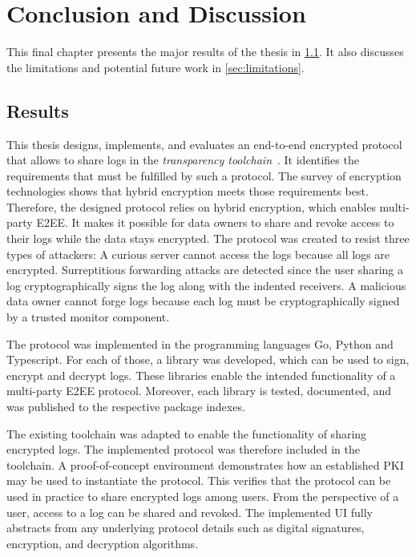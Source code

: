 \documentclass[../main.tex]{subfiles}
\begin{document}
\chapter{Conclusion and Discussion}
\label{chap:conclusion}

This final chapter presents the major results of the thesis in \cref{sec:result}.
It also discusses the limitations and potential future work in \cref{sec:limitations}.

\section{Results}
\label{sec:result}

This thesis designs, implements, and evaluates an end-to-end encrypted protocol that allows to share logs in the \emph{transparency toolchain}~\cite{Zieglmeier2021}.
It identifies the requirements that must be fulfilled by such a protocol.
The survey of encryption technologies shows that hybrid encryption meets those requirements best.
Therefore, the designed protocol relies on hybrid encryption, which enables multi-party E2EE.
It makes it possible for data owners to share and revoke access to their logs while the data stays encrypted.
The protocol was created to resist three types of attackers: 
A curious server cannot access the logs because all logs are encrypted.
Surreptitious forwarding attacks are detected since the user sharing a log cryptographically signs the log along with the indented receivers.
A malicious data owner cannot forge logs because each log must be cryptographically signed by a trusted monitor component.

The protocol was implemented in the programming languages Go, Python and Typescript.
For each of those, a library was developed, which can be used to sign, encrypt and decrypt logs.
These libraries enable the intended functionality of a multi-party E2EE protocol.
Moreover, each library is tested, documented, and was published to the respective package indexes.

The existing toolchain was adapted to enable the functionality of sharing encrypted logs.
The implemented protocol was therefore included in the toolchain.
A proof-of-concept environment demonstrates how an established PKI may be used to instantiate the protocol.
This verifies that the protocol can be used in practice to share encrypted logs among users.
From the perspective of a user, access to a log can be shared and revoked.
The implemented UI fully abstracts from any underlying protocol details such as digital signatures, encryption, and decryption algorithms.
\end{document}
